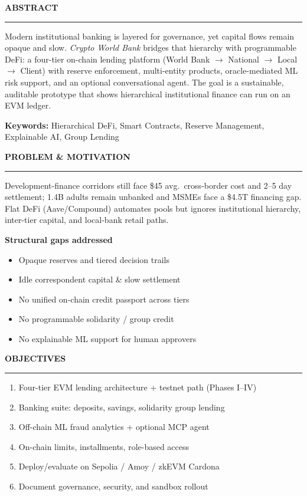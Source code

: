 \documentclass[10pt]{article}
\newcommand{\PosterSection}[1]{%
  \vspace{0.55em}%
  {\Large\bfseries\color{NavyBrand}\MakeUppercase{#1}\par}%
  {\color{AccentGold}\rule{\linewidth}{2.2pt}\par}%
  \vspace{0.35em}%
}
\begin{document}
\vspace{1.35cm}

\noindent
\begin{minipage}[t]{0.315\textwidth}
\PosterSection{Abstract}
{\small
Modern institutional banking is layered for governance, yet capital flows remain opaque and slow.
\textit{Crypto World Bank} bridges that hierarchy with programmable DeFi: a four-tier on-chain lending platform
(World Bank $\to$ National $\to$ Local $\to$ Client) with reserve enforcement, multi-entity products,
oracle-mediated ML risk support, and an optional conversational agent.
The goal is a sustainable, auditable prototype that shows hierarchical institutional finance can run on an EVM ledger.
\par\vspace{0.2em}
{\footnotesize\textbf{Keywords:} Hierarchical DeFi, Smart Contracts, Reserve Management, Explainable AI, Group Lending}
}

\PosterSection{Problem \& Motivation}
{\small
Development-finance corridors still face \$45 avg.\ cross-border cost and 2--5 day settlement;
1.4B adults remain unbanked and MSMEs face a \$4.5T financing gap.
Flat DeFi (Aave/Compound) automates pools but ignores institutional hierarchy, inter-tier capital, and local-bank retail paths.
}

{\small\textbf{Structural gaps addressed}}
\begin{itemize}
\item Opaque reserves and tiered decision trails
\item Idle correspondent capital \& slow settlement
\item No unified on-chain credit passport across tiers
\item No programmable solidarity / group credit
\item No explainable ML support for human approvers
\end{itemize}

\PosterSection{Objectives}
\begin{enumerate}[label=\textbf{O\arabic*.},leftmargin=1.6em]
\item{\small Four-tier EVM lending architecture + testnet path (Phases I--IV)}
\item{\small Banking suite: deposits, savings, solidarity group lending}
\item{\small Off-chain ML fraud analytics + optional MCP agent}
\item{\small On-chain limits, installments, role-based access}
\item{\small Deploy/evaluate on Sepolia / Amoy / zkEVM Cardona}
\item{\small Document governance, security, and sandbox rollout}
\end{enumerate}


\end{minipage}
\end{document}
